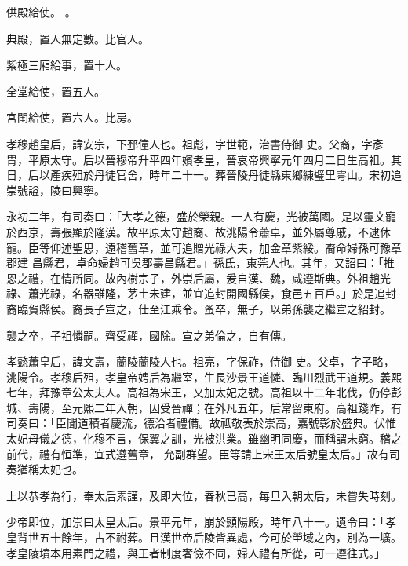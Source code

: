 \begin{pinyinscope}
供殿給使。
 。



 典殿，置人無定數。比官人。



 紫極三廂給事，置十人。



 全堂給使，置五人。



 宮閨給使，置六人。比房。



 孝穆趙皇后，諱安宗，下邳僮人也。祖彪，字世範，治書侍御
 史。父裔，字彥胄，平原太守。后以晉穆帝升平四年嬪孝皇，晉哀帝興寧元年四月二日生高祖。其日，后以產疾殂於丹徒官舍，時年二十一。葬晉陵丹徒縣東鄉練璧里雩山。宋初追崇號謚，陵曰興寧。



 永初二年，有司奏曰：「大孝之德，盛於榮親。一人有慶，光被萬國。是以靈文寵於西京，壽張顯於隆漢。故平原太守趙裔、故洮陽令蕭卓，並外屬尊戚，不逮休寵。臣等仰述聖思，遠稽舊章，並可追贈光祿大夫，加金章紫綏。裔命婦孫可豫章郡建
 昌縣君，卓命婦趙可吳郡壽昌縣君。」孫氏，東莞人也。其年，又詔曰：「推恩之禮，在情所同。故內樹宗子，外崇后屬，爰自漢、魏，咸遵斯典。外祖趙光祿、蕭光祿，名器雖隆，茅土未建，並宜追封開國縣侯，食邑五百戶。」於是追封裔臨賀縣侯。裔長子宣之，仕至江乘令。蚤卒，無子，以弟孫襲之繼宣之紹封。



 襲之卒，子祖憐嗣。齊受禪，國除。宣之弟倫之，自有傳。



 孝懿蕭皇后，諱文壽，蘭陵蘭陵人也。祖亮，字保祚，侍御
 史。父卓，字子略，洮陽令。孝穆后殂，孝皇帝娉后為繼室，生長沙景王道憐、臨川烈武王道規。義熙七年，拜豫章公太夫人。高祖為宋王，又加太妃之號。高祖以十二年北伐，仍停彭城、壽陽，至元熙二年入朝，因受晉禪；在外凡五年，后常留東府。高祖踐阼，有司奏曰：「臣聞道積者慶流，德洽者禮備。故祗敬表於崇高，嘉號彰於盛典。伏惟太妃母儀之德，化穆不言，保翼之訓，光被洪業。雖幽明同慶，而稱謂未窮。稽之前代，禮有恒準，宜式遵舊章，
 允副群望。臣等請上宋王太后號皇太后。」故有司奏猶稱太妃也。



 上以恭孝為行，奉太后素謹，及即大位，春秋已高，每旦入朝太后，未嘗失時刻。



 少帝即位，加崇曰太皇太后。景平元年，崩於顯陽殿，時年八十一。遺令曰：「孝皇背世五十餘年，古不祔葬。且漢世帝后陵皆異處，今可於塋域之內，別為一壙。孝皇陵墳本用素門之禮，與王者制度奢儉不同，婦人禮有所從，可一遵往式。」




\end{pinyinscope}
